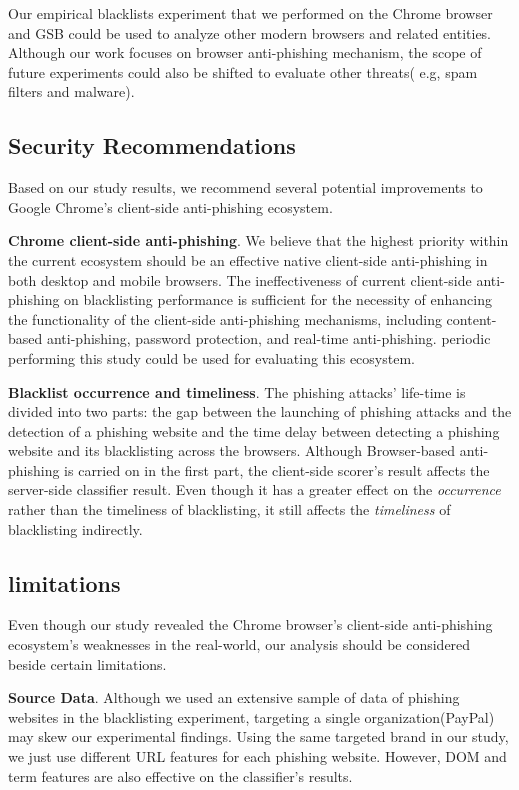 Our empirical blacklists experiment that we performed on the Chrome browser and GSB could be used to analyze other modern browsers and related entities. 
Although our work focuses on browser anti-phishing mechanism, the scope of future experiments could also be shifted to evaluate other threats( e.g, spam filters and  malware). 

\subsection{Security Recommendations}

Based on our study results, we recommend several potential improvements to Google Chrome's client-side anti-phishing ecosystem.

\textbf{Chrome client-side anti-phishing}. We believe that the highest priority within the current ecosystem should be an effective native client-side anti-phishing in both desktop and mobile browsers. The ineffectiveness of current client-side anti-phishing on blacklisting performance is sufficient for the necessity of enhancing the functionality of the client-side anti-phishing mechanisms, including content-based anti-phishing, password protection, and real-time anti-phishing. periodic performing this study could be used for evaluating this ecosystem.

\textbf{Blacklist occurrence and timeliness}. The phishing attacks' life-time is divided into two parts: the gap between the launching of phishing attacks and the detection of a phishing website and the time delay between detecting a phishing website and its blacklisting across the browsers.
Although Browser-based anti-phishing is carried on in the first part, the client-side scorer's result affects the server-side classifier result. Even though it has a greater effect on the \textit{occurrence} rather than the timeliness of blacklisting, it still affects the \textit{timeliness} of blacklisting indirectly. 

\subsection{limitations}
Even though our study revealed the Chrome browser's client-side anti-phishing ecosystem's weaknesses in the real-world, our analysis should be considered beside certain limitations.

\textbf{Source Data}. Although we used an extensive sample of data of phishing websites in the blacklisting experiment, targeting a single organization(PayPal) may skew our experimental findings. 
Using the same targeted brand in our study, we just use different URL features for each phishing website. However, DOM and term features are also effective on the classifier's results. 


